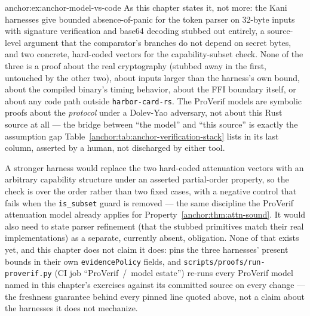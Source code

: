 \begin{pdSolution}{anchor:ex:anchor-model-vs-code}
As this chapter states it, not more: the Kani harnesses give bounded absence-of-panic for the token parser on 32-byte inputs with signature verification and base64 decoding stubbed out entirely, a source-level argument that the comparator's branches do not depend on secret bytes, and two concrete, hard-coded vectors for the capability-subset check. None of the three is a proof about the real cryptography (stubbed away in the first, untouched by the other two), about inputs larger than the harness's own bound, about the compiled binary's timing behavior, about the FFI boundary itself, or about any code path outside \texttt{harbor-card-rs}. The ProVerif models are symbolic proofs about the \emph{protocol} under a Dolev-Yao adversary, not about this Rust source at all --- the bridge between ``the model'' and ``this source'' is exactly the assumption gap Table~\ref{anchor:tab:anchor-verification-stack} lists in its last column, asserted by a human, not discharged by either tool.

A stronger harness would replace the two hard-coded attenuation vectors with an arbitrary capability structure under an asserted partial-order property, so the check is over the order rather than two fixed cases, with a negative control that fails when the \texttt{is\_subset} guard is removed --- the same discipline the ProVerif attenuation model already applies for Property~\ref{anchor:thm:attn-sound}. It would also need to state parser refinement (that the stubbed primitives match their real implementations) as a separate, currently absent, obligation. None of that exists yet, and this chapter does not claim it does:  pins the three harnesses' present bounds in their own \texttt{evidencePolicy} fields, and \texttt{scripts/proofs/run-proverif.py} (CI job ``ProVerif~/~model estate'') re-runs every ProVerif model named in this chapter's exercises against its committed source on every change --- the freshness guarantee behind every pinned line quoted above, not a claim about the harnesses it does not mechanize.
\end{pdSolution}
